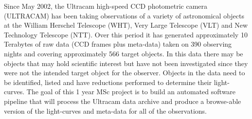 Since May 2002, the  Ultracam high-speed CCD photometric camera 
(ULTRACAM) has been taking observations of a variety of astronomical 
objects at the William Herschel Telescope (WHT), Very Large 
Telescope (VLT) and New Technology Telescope (NTT). Over this period 
it has generated approximately 10 Terabytes of raw data (CCD frames 
plus meta-data) taken on 390 observing nights and covering 
approximately 566 target objects. In this data there may be objects 
that may hold scientific interest but have not been investigated since they were not the intended target object for the observer. 
Objects in the data need to be identified, listed and have 
reductions performed to determine their light-curves. The goal of 
this 1 year MSc project is to build an automated software pipeline 
that will process the Ultracam data archive and produce a 
browse-able version of the light-curves and meta-data for all of the 
observations. 
